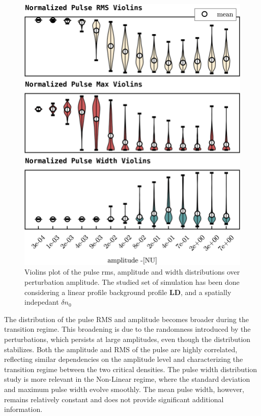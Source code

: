 \documentclass[11pt,a4paper,openany]{report}
\begin{document}
\begin{multicols}{2}
    \begin{figure}[H]
        \centering
        \includegraphics[width=1\linewidth]{./figures/pulse_overview.png}
        \caption{Violins plot of the pulse rms, amplitude and width distributions over perturbation amplitude. The studied set of simulation has been done considering a linear profile background profile \textbf{LD}, and a spatially indepedant $\delta n_0$ }
        \label{fig:barrier}
    \end{figure}The distribution of the pulse RMS and amplitude becomes broader during the transition regime. This broadening is due to the randomness introduced by the perturbations, which persists at large amplitudes, even though the distribution stabilizes. Both the amplitude and RMS of the pulse are highly correlated, reflecting similar dependencies on the amplitude level and characterizing the transition regime between the two critical densities. The pulse width distribution study is more relevant in the Non-Linear regime, where the standard deviation and maximum pulse width evolve smoothly. The mean pulse width, however, remains relatively constant and does not provide significant additional information.


\end{multicols}
\end{document}
